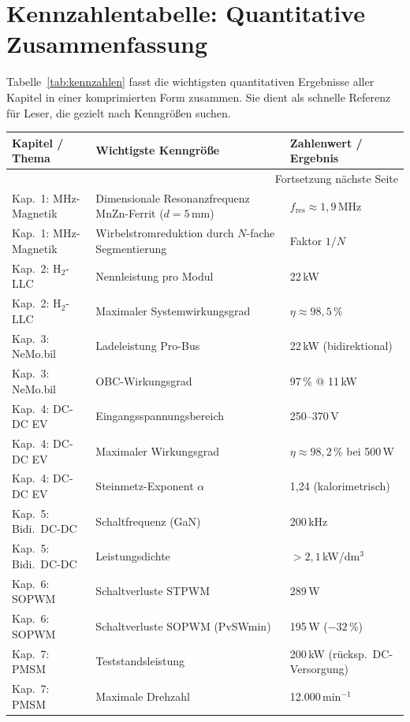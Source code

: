 ﻿\documentclass[a4paper,12pt,openany,oneside]{book}
\newcommand{\abschnitt}[1]{\section{#1}}
\theoremstyle{definition}
\begin{document}
\abschnitt{Kennzahlentabelle: Quantitative Zusammenfassung}

Tabelle~\ref{tab:kennzahlen} fasst die wichtigsten quantitativen Ergebnisse aller
Kapitel in einer komprimierten Form zusammen. Sie dient als schnelle Referenz
f\"ur Leser, die gezielt nach Kenngr\"o\ss{}en suchen.

\begin{longtable}{p{3.0cm}p{4.3cm}p{5.2cm}}
\toprule
\textbf{Kapitel / Thema} & \textbf{Wichtigste Kenngr\"o\ss{}e} & \textbf{Zahlenwert / Ergebnis} \\
\midrule
\endhead
\midrule
\multicolumn{3}{r}{\small Fortsetzung n\"achste Seite}\\
\endfoot
\bottomrule
\endlastfoot
Kap.\ 1: MHz-Magnetik &
  Dimensionale Resonanzfrequenz MnZn-Ferrit ($d=5$\,mm) &
  $f_\mathrm{res} \approx 1{,}9$\,MHz \\
Kap.\ 1: MHz-Magnetik &
  Wirbelstromreduktion durch $N$-fache Segmentierung &
  Faktor $1/N$ \\
Kap.\ 2: H$_2$-LLC &
  Nennleistung pro Modul &
  22\,kW \\
Kap.\ 2: H$_2$-LLC &
  Maximaler Systemwirkungsgrad &
  $\eta \approx 98{,}5$\,\% \\
Kap.\ 3: NeMo.bil &
  Ladeleistung Pro-Bus &
  22\,kW (bidirektional) \\
Kap.\ 3: NeMo.bil &
  OBC-Wirkungsgrad &
  97\,\% @ 11\,kW \\
Kap.\ 4: DC-DC EV &
  Ein\-gangs\-span\-nungs\-be\-reich &
  250--370\,V \\
Kap.\ 4: DC-DC EV &
  Maximaler Wirkungsgrad &
  $\eta \approx 98{,}2$\,\% bei 500\,W \\
Kap.\ 4: DC-DC EV &
  Steinmetz-Exponent $\alpha$ &
  1{,}24 (kalorimetrisch) \\
Kap.\ 5: Bidi.\ DC-DC &
  Schaltfrequenz (GaN) &
  200\,kHz \\
Kap.\ 5: Bidi.\ DC-DC &
  Leistungsdichte &
  $> 2{,}1$\,kW/dm$^3$ \\
Kap.\ 6: SOPWM &
  Schaltverluste STPWM &
  289\,W \\
Kap.\ 6: SOPWM &
  Schaltverluste SOPWM (PvSWmin) &
  195\,W ($-32$\,\%) \\
Kap.\ 7: PMSM &
  Teststandsleistung &
  200\,kW (r\"ucksp.\ DC-Versorgung) \\
Kap.\ 7: PMSM &
  Maximale Drehzahl &
  12.000\,min$^{-1}$ \\

\end{longtable}
\end{document}
